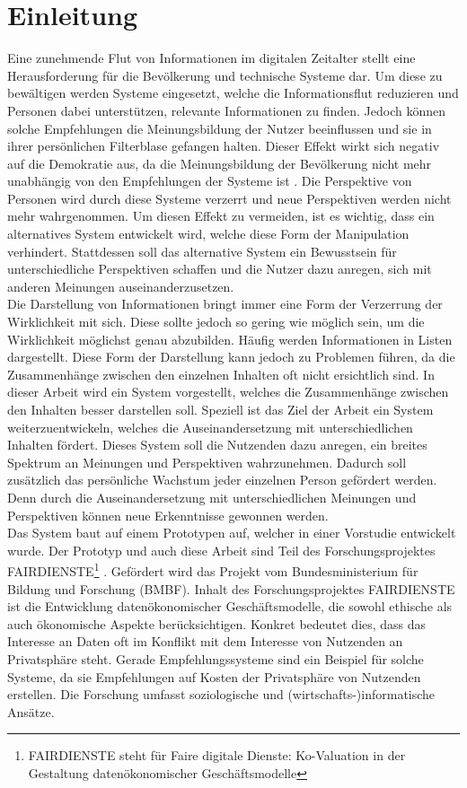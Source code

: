 \section{Einleitung}
Eine zunehmende Flut von Informationen im digitalen Zeitalter stellt eine Herausforderung für die Bevölkerung und technische Systeme dar.
Um diese zu bewältigen werden Systeme eingesetzt, welche die Informationsflut reduzieren und Personen dabei unterstützen, relevante Informationen zu finden.
Jedoch können solche Empfehlungen die Meinungsbildung der Nutzer beeinflussen und sie in ihrer persönlichen Filterblase gefangen halten.
Dieser Effekt wirkt sich negativ auf die Demokratie aus, da die Meinungsbildung der Bevölkerung nicht mehr unabhängig von den Empfehlungen der Systeme ist \cite{breaking-filter-bubble}.
Die Perspektive von Personen wird durch diese Systeme verzerrt und neue Perspektiven werden nicht mehr wahrgenommen.
Um diesen Effekt zu vermeiden, ist es wichtig, dass ein alternatives System entwickelt wird, welche diese Form der Manipulation verhindert.
Stattdessen soll das alternative System ein Bewusstsein für unterschiedliche Perspektiven schaffen und die Nutzer dazu anregen, sich mit anderen Meinungen auseinanderzusetzen. \\

Die Darstellung von Informationen bringt immer eine Form der Verzerrung der Wirklichkeit mit sich.
Diese sollte jedoch so gering wie möglich sein, um die Wirklichkeit möglichst genau abzubilden.
Häufig werden Informationen in Listen dargestellt.
Diese Form der Darstellung kann jedoch zu Problemen führen, da die Zusammenhänge zwischen den einzelnen Inhalten oft nicht ersichtlich sind.
In dieser Arbeit wird ein System vorgestellt, welches die Zusammenhänge zwischen den Inhalten besser darstellen soll.
Speziell ist das Ziel der Arbeit ein System weiterzuentwickeln, welches die Auseinandersetzung mit unterschiedlichen Inhalten fördert.
Dieses System soll die Nutzenden dazu anregen, ein breites Spektrum an Meinungen und Perspektiven wahrzunehmen.
Dadurch soll zusätzlich das persönliche Wachstum jeder einzelnen Person gefördert werden.
Denn durch die Auseinandersetzung mit unterschiedlichen Meinungen und Perspektiven können neue Erkenntnisse gewonnen werden. \\

Das System baut auf einem Prototypen auf, welcher in einer Vorstudie entwickelt wurde.
Der Prototyp und auch diese Arbeit sind Teil des Forschungsprojektes FAIRDIENSTE\footnote{FAIRDIENSTE steht für \glqq Faire digitale Dienste: Ko-Valuation in der Gestaltung datenökonomischer Geschäftsmodelle\grqq{}} \cite{fairdienste}.
Gefördert wird das Projekt vom Bundesministerium für Bildung und Forschung (BMBF).
Inhalt des Forschungsprojektes FAIRDIENSTE ist die Entwicklung datenökonomischer Geschäftsmodelle, die sowohl ethische als auch ökonomische Aspekte berücksichtigen.
Konkret bedeutet dies, dass das Interesse an Daten oft im Konflikt mit dem Interesse von Nutzenden an Privatsphäre steht.
Gerade Empfehlungssysteme sind ein Beispiel für solche Systeme, da sie Empfehlungen auf Kosten der Privatsphäre von Nutzenden erstellen.
Die Forschung umfasst soziologische und (wirtschafts-)informatische Ansätze. \\

